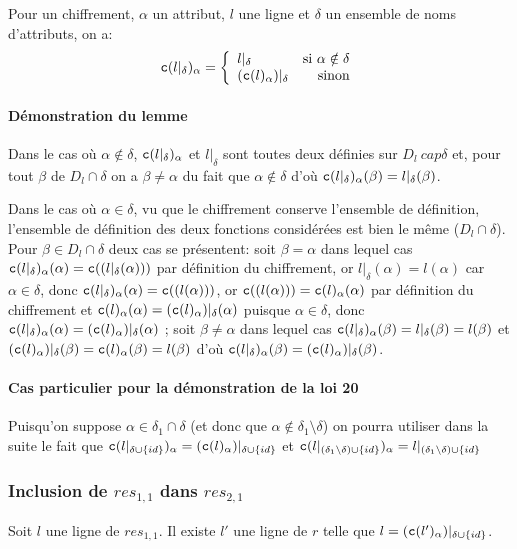 \documentclass[french]{article}
\newcommand\typeT[1]{\text{\ttfamily #1}}
\newcommand{\cy}[1]{\typeT{c}(#1)}
\newcommand{\cip}{\cup \{id\}}
\newcommand{\dilta}{{\delta \cip}}
\begin{document}
Pour \typeT{c} un chiffrement,
$\alpha$ un attribut, $l$ une ligne
et $\delta$ un ensemble de noms d'attributs, 
on a:
$$
\cy{l|_\delta}_\alpha =
\left\lbrace
\begin{array}{lr}
l|_\delta & \text{si $\alpha \notin \delta$} \\
(\cy{l}_\alpha)|_\delta & \text{sinon}
\end{array}
\right.
$$

\paragraph*{Démonstration du lemme}
Dans le cas où $\alpha \notin \delta$,
$\cy{l|_\delta}_\alpha$ et $l|_\delta$
sont toutes deux définies sur $D_l \ cap \delta$
et, pour tout $\beta$ de $D_l \cap \delta$ on a
$\beta \neq \alpha$ du fait que $\alpha \notin \delta$
d'où
$\cy{l|_\delta}_\alpha(\beta) = l|_\delta(\beta)$.

Dans le cas où $\alpha \in \delta$,
vu que le chiffrement conserve l'ensemble de définition,
l'ensemble de définition des deux fonctions considérées est bien
le même ($D_l \cap \delta$).
Pour $\beta \in D_l \cap \delta$ deux cas se présentent:
soit $\beta = \alpha$ dans lequel cas
$\cy{l|_\delta}_\alpha(\alpha) = \cy{(l|_\delta(\alpha))}$
par définition du chiffrement,
or $l|_\delta(\alpha) = l(\alpha)$
car $\alpha \in \delta$,
donc $\cy{l|_\delta}_\alpha(\alpha) = \cy{(l(\alpha))}$,
or $\cy{(l(\alpha))} = \cy{l}_\alpha(\alpha)$
par définition du chiffrement
et $\cy{l}_\alpha(\alpha) = (\cy{l}_\alpha)|_\delta(\alpha)$
puisque $\alpha \in \delta$,
donc $\cy{l|_\delta}_\alpha(\alpha) = (\cy{l}_\alpha)|_\delta(\alpha)$ ;
soit $\beta \neq \alpha$ dans lequel cas
$\cy{l|_\delta}_\alpha(\beta) = l|_\delta(\beta) = l(\beta)$
et $(\cy{l}_\alpha)|_\delta(\beta) = \cy{l}_\alpha(\beta) = l(\beta)$
d'où $\cy{l|_\delta}_\alpha(\beta) = (\cy{l}_\alpha)|_\delta(\beta)$.

\paragraph*{Cas particulier pour la démonstration de la loi 20}
Puisqu'on suppose $\alpha \in \delta_1 \cap \delta$
(et donc que $\alpha \notin \delta_1 \setminus \delta$)
on pourra utiliser dans la suite le fait que
$\cy{l|_\dilta}_\alpha = (\cy{l}_\alpha)|_\dilta$
et
$\cy{l|_{(\delta_1 \setminus \delta) \cip}}_\alpha
= l|_{(\delta_1 \setminus \delta) \cip }$

\subsubsection*{Inclusion de $res_{1,1}$ dans $res_{2,1}$}
Soit $l$ une ligne de $res_{1,1}$.
Il existe $l'$ une ligne de $r$ telle que
$l = (\cy{l'}_\alpha)|_\dilta$.
\end{document}
